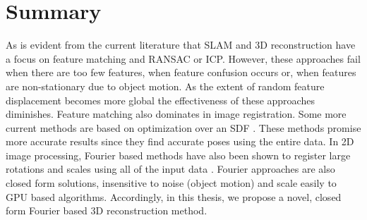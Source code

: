 \section{Summary}

As is evident from the current literature that SLAM and 3D reconstruction have a focus on feature matching and RANSAC or ICP. However, these approaches fail when there are too few features, when feature confusion occurs or, when features are non-stationary due to object motion. As the extent of random feature displacement becomes more global the effectiveness of these approaches diminishes. Feature matching also dominates in image registration. Some more current methods are based on optimization over an SDF \cite{Bylow13Real,Rusinkiewicz02Real}. These methods promise more accurate results since they find accurate poses using the entire data. In 2D image processing, Fourier based methods have also been shown to register large rotations and scales using all of the input data \cite{Gonzalez11Improving}. Fourier approaches are also closed form solutions, insensitive to noise (object motion) and scale easily to GPU based algorithms. Accordingly, in this thesis, we propose a novel, closed form Fourier based 3D reconstruction method. \\
